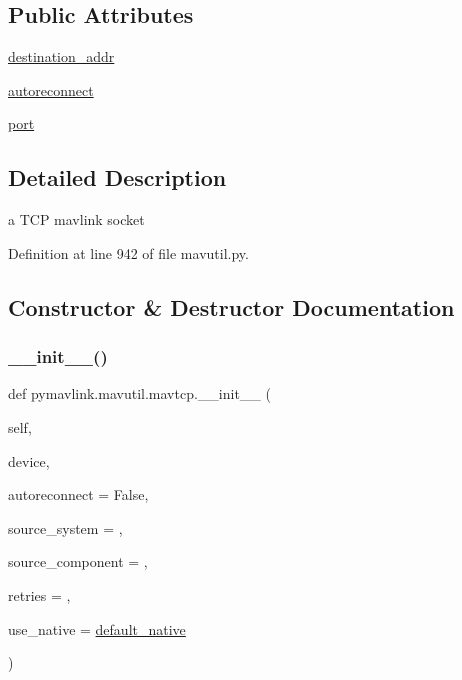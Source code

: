 \subsection*{Public Attributes}
\begin{DoxyCompactItemize}
\item 
\mbox{\hyperlink{classpymavlink_1_1mavutil_1_1mavtcp_a7a7efbeb3512d855ba5ed722ab5df2ec}{destination\+\_\+addr}}
\item 
\mbox{\hyperlink{classpymavlink_1_1mavutil_1_1mavtcp_adbcfafdf4396034a93ede2fb765a0a7c}{autoreconnect}}
\item 
\mbox{\hyperlink{classpymavlink_1_1mavutil_1_1mavtcp_adb18344f59fadaccd747f90faf0e9aaf}{port}}
\end{DoxyCompactItemize}


\subsection{Detailed Description}
\begin{DoxyVerb}a TCP mavlink socket\end{DoxyVerb}
 

Definition at line 942 of file mavutil.\+py.



\subsection{Constructor \& Destructor Documentation}
\mbox{\label{classpymavlink_1_1mavutil_1_1mavtcp_adf1a689aad2d817c908756032df6629f}} 
\subsubsection{\texorpdfstring{\_\_init\_\_()}{\_\_init\_\_()}}
{\footnotesize\ttfamily def pymavlink.\+mavutil.\+mavtcp.\+\_\+\+\_\+init\+\_\+\+\_\+ (\begin{DoxyParamCaption}\item[{}]{self,  }\item[{}]{device,  }\item[{}]{autoreconnect = {\ttfamily False},  }\item[{}]{source\+\_\+system = {},  }\item[{}]{source\+\_\+component = {},  }\item[{}]{retries = {},  }\item[{}]{use\+\_\+native = {\ttfamily \mbox{\hyperlink{namespacepymavlink_1_1mavutil_a21ce9da7b698a7bc21c44b9f77341b62}{default\+\_\+native}}} }\end{DoxyParamCaption})}



